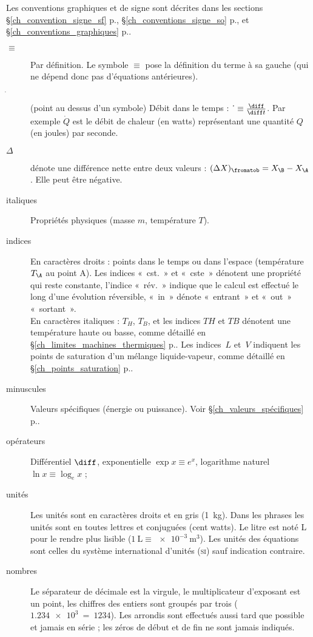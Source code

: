 
\TabPositions{2cm}

Les conventions graphiques et de signe sont décrites dans les sections \S\ref{ch_convention_signe_sf} p.\pageref{ch_convention_signe_sf}, \S\ref{ch_conventions_signe_so} p.\pageref{ch_convention_signe_so}, et \S\ref{ch_conventions_graphiques} p.\pageref{ch_conventions_graphiques}.

\begin{description}
	\item[$\equiv$] 	\tab Par définition. Le symbole $\equiv$ pose la définition du terme à sa gauche (qui ne dépend donc pas d’équations antérieures).
	\item[$\dot~$]		\tab (point au dessus d’un symbole) Débit dans le temps : $\dot~ \equiv \frac{\diff}{\diff t}$. Par exemple $\dot Q$ est le débit de chaleur (en \si{watts}) représentant une quantité $Q$ (en \si{joules}) par \si{seconde}.
	\item[$\Delta$]	\tab dénote une différence nette entre deux valeurs : $(\Delta X)_\fromatob = X_\B - X_\A$. Elle peut être négative.
	\item[italiques] 	Propriétés physiques (masse $m$, température $T$).
	\item[indices]		En caractères droits : points dans le temps ou dans l’espace (température~$T_\A$ au point A). Les indices «~cst.~» et «~cste~» dénotent une propriété qui reste constante, l’indice «~rév.~» indique que le calcul est effectué le long d’une évolution réversible, «~in~» dénote «~entrant~» et «~out~» «~sortant~».\\
							En caractères italiques : $T_H$, $T_B$, et les indices $TH$ et $TB$ dénotent une température haute ou basse, comme détaillé en \S\ref{ch_limites_machines_thermiques} p.\pageref{ch_limites_machines_thermiques}. Les indices~$L$ et~$V$ indiquent les points de saturation d’un mélange liquide-vapeur, comme détaillé en \S\ref{ch_points_saturation} p.\pageref{ch_points_saturation}.
	\item[minuscules]	Valeurs spécifiques (énergie ou puissance). Voir \S\ref{ch_valeurs_spécifiques} p.\pageref{ch_valeurs_spécifiques}.
	\item[opérateurs]	Différentiel $\diff$, exponentielle $\exp x \equiv e^x $, logarithme naturel $\ln x \equiv \log_e x$ ;
	\item[unités]		Les unités sont en caractères droits et en gris (\SI{1}{\kilogram}). Dans les phrases les unités sont en toutes lettres et conjuguées (cent \si{watts}). Le \si{litre} est noté \si{\liter} pour le rendre plus lisible ($\SI{1}{\liter} \equiv \SI{e-3}{\metre\cubed}$). Les unités des équations sont celles du système international d’unités (\textsc{si}) sauf indication contraire.
	\item[nombres]		Le séparateur de décimale est la virgule, le multiplicateur d’exposant est un point, les chiffres des entiers sont groupés par trois ($\SI{1,234e3} ~=~ \num{1234}$). Les arrondis sont effectués aussi tard que possible et jamais en série ; les zéros de début et de fin ne sont jamais indiqués.
\end{description}
